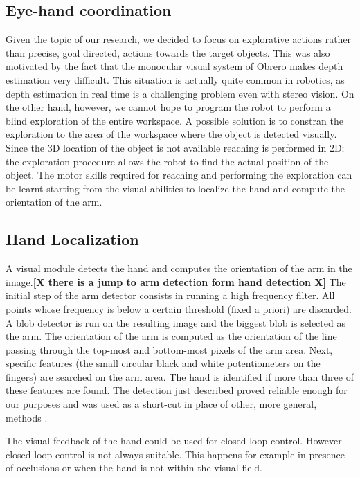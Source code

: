 \subsection{Eye-hand coordination}
Given the topic of our research, we decided to focus on explorative
actions rather than precise, goal directed, actions towards the target objects.
This was also motivated by the fact that the monocular visual system of Obrero
makes depth estimation very difficult. This situation is actually quite common
in robotics, as depth estimation in real time is a challenging problem even with
stereo vision.
On the other hand, however, we cannot hope to program the robot to perform
a blind exploration of the entire workspace. A possible solution is to
constran the exploration to the area of the workspace where the object is
detected visually. Since the 3D location of the object is not available reaching
is performed in 2D; the exploration procedure allows the robot to find the actual
position of the object. The motor skills required for reaching and performing
the exploration can be learnt starting from the visual abilities
to localize the hand and compute the orientation of the arm.

\subsection{Hand Localization}
A visual module detects the hand and computes the orientation of
the arm in the image.\textbf{[X there is a jump to arm detection
form hand detection X]} The initial step of the arm detector
consists in running a high frequency filter. All points whose
frequency is below a certain threshold (fixed a priori) are
discarded. A blob detector is run on the resulting image and the
biggest blob is selected as the arm. The orientation of the arm is
computed as the orientation of the line passing through the
top-most and bottom-most pixels of the arm area. Next, specific
features (the small circular black and white potentiometers on the
fingers) are searched on the arm area. The hand is identified if
more than three of these features are found. The detection just
described proved reliable enough for our purposes and was used as
a short-cut in place of other, more general, methods
\cite{metta03early,natale05from}.

The visual feedback of the hand could be used for closed-loop control.
However closed-loop control is not always suitable. This happens for example
in presence of occlusions or when the hand is not within the visual field.

